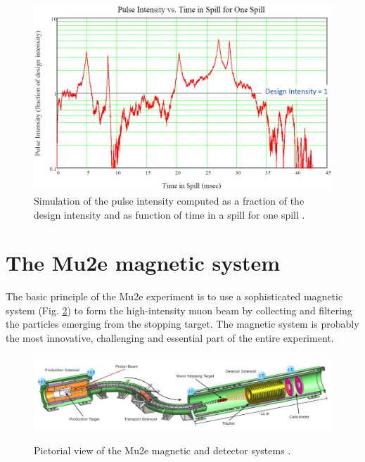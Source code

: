 \documentclass[12pt,a4paper,openright, oneside, titlepage]{book} %
\begin{document}
\begin{figure}[h!]
\centering
\includegraphics[scale=0.6]{POT_sim}
\caption[Proton pulse intensity fluctuations]{Simulation of the pulse intensity computed as a fraction  
of the design intensity and 
as function of time in a spill for one spill \cite{SpillSim}.}
\label{_POT_sim}
\end{figure}

\section{The Mu2e magnetic system}
The basic principle of the Mu2e experiment is to use a sophisticated magnetic system (Fig. \ref{_mu2e_apparatus_pre}) 
to form the high-intensity muon beam by collecting and filtering the particles emerging from the stopping target. 
The magnetic system is probably the most innovative, challenging and essential part of the entire experiment. 

\begin{figure}[h!]
\centering
\includegraphics[scale=0.6]{mu2e_apparatus}\\
\caption[Mu2e apparatus]{Pictorial view of the Mu2e magnetic and detector systems \cite{Giovannella}.}
\label{_mu2e_apparatus_pre}
\end{figure}
\end{document}
